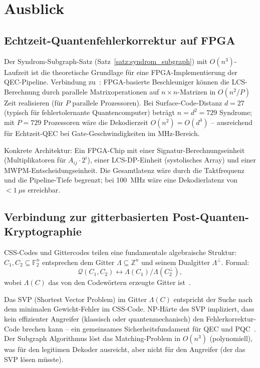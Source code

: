 ﻿\documentclass[a4paper,12pt]{article}
\theoremstyle{definition}
\begin{document}
\section{Ausblick}

\subsection{Echtzeit-Quantenfehlerkorrektur auf FPGA}

Der Syndrom-Subgraph-Satz (Satz~\ref{satz:syndrom_subgraph}) mit $O(n^3)$-Laufzeit
ist die theoretische Grundlage f\"ur eine FPGA-Implementierung der QEC-Pipeline.
Verbindung zu~\cite{epp2026fpga}: FPGA-basierte Beschleuniger k\"onnen die
LCS-Berechnung durch parallele Matrixoperationen auf $n \times n$-Matrizen
in $O(n^2 / P)$ Zeit realisieren (f\"ur $P$ parallele Prozessoren).
Bei Surface-Code-Distanz $d = 27$ (typisch f\"ur fehlertolernante Quantencomputer)
betr\"agt $n = d^2 = 729$ Syndrome; mit $P = 729$ Prozessoren w\"are die
Dekodierzeit $O(n^2) = O(d^4)$ -- ausreichend f\"ur Echtzeit-QEC bei
Gate-Geschwindigkeiten im MHz-Bereich.

Konkrete Architektur: Ein FPGA-Chip mit einer Signatur-Berechnungseinheit
(Multiplikatoren f\"ur $A_{ij} \cdot 2^i$), einer LCS-DP-Einheit
(systolisches Array) und einer MWPM-Entscheidungseinheit.
Die Gesamtlatenz w\"are durch die Taktfrequenz und die Pipeline-Tiefe begrenzt;
bei 100~MHz w\"are eine Dekodierlatenz von $< 1~\mu$s erreichbar.

\subsection{Verbindung zur gitterbasierten Post-Quanten-Kryptographie}

CSS-Codes und Gittercodes teilen eine fundamentale algebraische Struktur:
$C_1, C_2 \subseteq \mathbb{F}_2^n$ entsprechen dem Gitter
$\Lambda \subseteq \mathbb{Z}^n$ und seinem Dualgitter $\Lambda^\perp$.
Formal:
\[
\mathcal{Q}(C_1, C_2) \leftrightarrow \Lambda(C_1) / \Lambda(C_2^\perp),
\]
wobei $\Lambda(C)$ das von den Codew\"ortern erzeugte Gitter ist~\cite{epp2026lattice}.

Das SVP (Shortest Vector Problem) im Gitter $\Lambda(C)$ entspricht der
Suche nach dem minimalen Gewicht-Fehler im CSS-Code.
NP-H\"arte des SVP impliziert, dass kein effizienter Angreifer (klassisch
oder quantenmechanisch) den Fehlerkorrektur-Code brechen kann -- ein
gemeinsames Sicherheitsfundament f\"ur QEC und PQC~\cite{epp2026pqc}.
Der Subgraph Algorithmus l\"ost das Matching-Problem in $O(n^3)$
(polynomiell), was f\"ur den legitimen Dekoder ausreicht, aber nicht
f\"ur den Angreifer (der das SVP l\"osen m\"usste).
\end{document}
